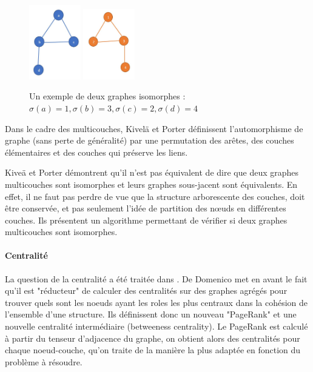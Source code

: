 \documentclass[11pt,a4paper]{article}
\theoremstyle{definition}
\theoremstyle{remark}
\theoremstyle{remark}
\begin{document}
\begin{figure}[H]
\centering
	\includegraphics[width=0.2\textwidth]{graph1iso.JPG}
	\includegraphics[width=0.2\textwidth]{graph2iso.JPG} 
	
	\caption{Un exemple de deux graphes isomorphes : $\sigma(a)=1, \sigma(b)=3, \sigma(c)=2, \sigma(d)=4$}
\end{figure}

Dans le cadre des multicouches, Kivelä et Porter \cite{isoMulti} définissent l'automorphisme de graphe (sans perte de généralité) par une permutation des arêtes, des couches élémentaires et des couches qui préserve les liens.


Kiveä et Porter démontrent qu'il n'est pas équivalent de dire que deux graphes multicouches sont isomorphes et leurs graphes sous-jacent sont équivalents. En effet, il ne faut pas perdre de vue que la structure \og arborescente \fg{} des couches, doit être conservée, et pas seulement l'idée de \og partition \fg{} des nœuds en différentes couches. Ils présentent un algorithme permettant de vérifier si deux graphes multicouches sont isomorphes.

\paragraph{Centralité}

La question de la centralité a été traitée dans \cite{centraliteMulti}. De Domenico met en avant le fait qu'il est "réducteur" de calculer des centralités sur des graphes agrégés pour trouver quels sont les noeuds ayant les roles les plus centraux dans la cohésion de l'ensemble d'une structure. Ils définissent donc un nouveau "PageRank" et une nouvelle centralité intermédiaire (betweeness centrality). Le PageRank est calculé à partir du tenseur d'adjacence du graphe, on obtient alors des centralités pour chaque noeud-couche, qu'on traite de la manière la plus adaptée en fonction du problème à résoudre.
\end{document}

